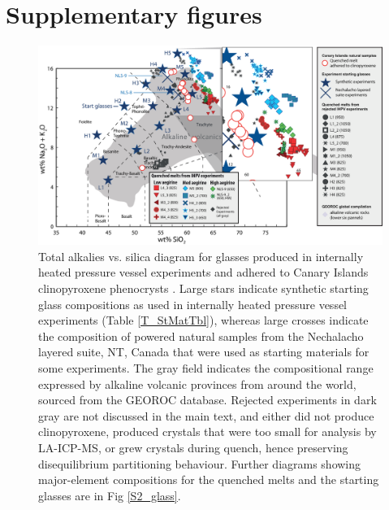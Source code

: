 \documentclass[review,authoryear,12pt]{elsarticle}
\begin{document}
\section{Supplementary figures}
% 
\begin{figure}[htpb]
\begin{center}
\includegraphics[width=1\textwidth]{S1_TAS_Aug2018.eps}
\caption[Total alkalies vs. silica diagram for glasses produced in the internally heated pressure vessel experiments]{Total alkalies vs. silica diagram for glasses produced in internally heated pressure vessel experiments and adhered to Canary Islands clinopyroxene phenocrysts \citep{LeBas1986TAS}. Large stars indicate synthetic starting glass compositions as used in internally heated pressure vessel experiments (Table \ref{T_StMatTbl}), whereas large crosses indicate the composition of powered natural samples from the Nechalacho layered suite, NT, Canada that were used as starting materials for some experiments. The gray field indicates the compositional range expressed by alkaline volcanic provinces from around the world, sourced from the GEOROC database. Rejected experiments in dark gray are not discussed in the main text, and either did not produce clinopyroxene, produced crystals that were too small for analysis by LA-ICP-MS, or grew crystals during quench, hence preserving disequilibrium partitioning behaviour. Further diagrams showing major-element compositions for the quenched melts and the starting glasses are in Fig \ref{S2_glass}.}
\label{TAS}
\end{center}
\end{figure}
\end{document}
